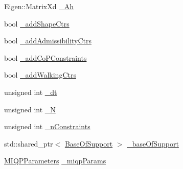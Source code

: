 \begin{DoxyCompactItemize}
\-Eigen\-::\-Matrix\-Xd \hyperlink{classMIQPLinearConstraints_aacba15c9dfc1c8f88e253a4f75e422fd}{\-\_\-\-Ah}
\item 
bool \hyperlink{classMIQPLinearConstraints_ae8df8b83e80484853b624f6693ed2725}{\-\_\-add\-Shape\-Ctrs}
\item 
bool \hyperlink{classMIQPLinearConstraints_a155ab4ad5ab14b793611c12473ce9297}{\-\_\-add\-Admissibility\-Ctrs}
\item 
bool \hyperlink{classMIQPLinearConstraints_a8e20d42828c638f41d074153cc0957d8}{\-\_\-add\-Co\-P\-Constraints}
\item 
bool \hyperlink{classMIQPLinearConstraints_ad1363c7fde3dd4f20adc92a7e1865579}{\-\_\-add\-Walking\-Ctrs}
\item 
unsigned int \hyperlink{classMIQPLinearConstraints_a403b0a1f684bda20236a759bd72950f2}{\-\_\-dt}
\item 
unsigned int \hyperlink{classMIQPLinearConstraints_a1edaf84d613dde3f86fd9e78aa14a077}{\-\_\-\-N}
\item 
unsigned int \hyperlink{classMIQPLinearConstraints_a2726424eb890fe556ce503096b418d0f}{\-\_\-n\-Constraints}
\item 
std\-::shared\-\_\-ptr$<$ \hyperlink{classBaseOfSupport}{\-Base\-Of\-Support} $>$ \hyperlink{classMIQPLinearConstraints_a9b26abbc012b0f39c6bef163d9c3faed}{\-\_\-base\-Of\-Support}
\item 
\hyperlink{structMIQPParameters}{\-M\-I\-Q\-P\-Parameters} \hyperlink{classMIQPLinearConstraints_a22f1b42e65d283a0d748333cc7119a7e}{\-\_\-miqp\-Params}
\end{DoxyCompactItemize}



